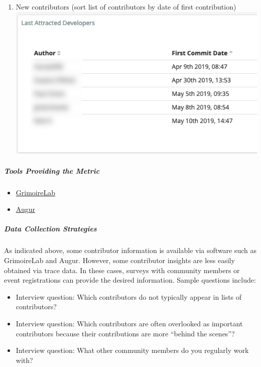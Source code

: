 \begin{enumerate}
\item
  New contributors (sort list of contributors by date of first
  contribution)
  \includegraphics{images/contributors_first-commit-date.png}
\end{enumerate}

\hypertarget{tools-providing-the-metric}{%
\subparagraph{Tools Providing the
Metric}\label{tools-providing-the-metric}}

\begin{itemize}
\tightlist
\item
  \href{https://chaoss.github.io/grimoirelab/}{GrimoireLab}
\item
  \href{http://augur.osshealth.io/api_docs/\#api-Evolution-Contributors_Repo_}{Augur}
\end{itemize}

\hypertarget{data-collection-strategies}{%
\subparagraph{Data Collection
Strategies}\label{data-collection-strategies}}

As indicated above, some contributor information is available via
software such as GrimoireLab and Augur. However, some contributor
insights are less easily obtained via trace data. In these cases,
surveys with community members or event registrations can provide the
desired information. Sample questions include:

\begin{itemize}
\tightlist
\item
  Interview question: Which contributors do not typically appear in
  lists of contributors?
\item
  Interview question: Which contributors are often overlooked as
  important contributors because their contributions are more ``behind
  the scenes''?
\item
  Interview question: What other community members do you regularly work
  with?
\end{itemize}


